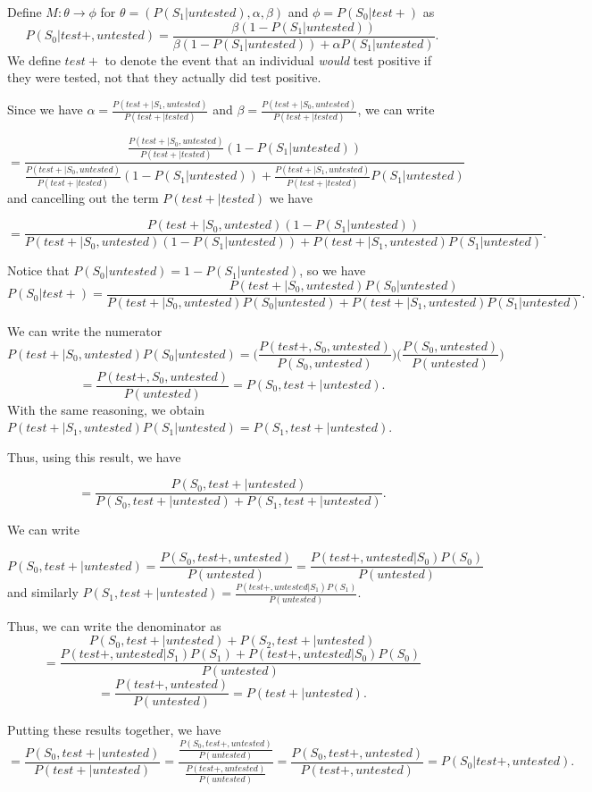 \documentclass[12pt,twoside]{smiththesis}
\begin{document}
Define \(M: \theta \to \phi\) for \(\theta = (P(S_1|untested), \alpha, \beta)\) and \(\phi = P(S_0|test +)\) as
\[P(S_0|test+, untested) = \frac{\beta(1 - P(S_1|untested))}{\beta(1-P(S_1|untested)) + \alpha P(S_1|untested)}.\]
We define \(test +\) to denote the event that an individual \emph{would} test positive if they were tested, not that they actually did test positive.

Since we have \(\alpha = \frac{P(test+|S_1, untested)}{P(test+|tested)}\) and \(\beta = \frac{P(test+|S_0, untested)}{P(test+|tested)}\), we can write

\[ = \frac{\frac{P(test+|S_0, untested)}{P(test+|tested)}(1 - P(S_1|untested))}{\frac{P(test+|S_0, untested)}{P(test+|tested)}(1-P(S_1|untested)) + \frac{P(test+|S_1, untested)}{P(test+|tested)} P(S_1|untested)}\]
and cancelling out the term \(P(test+|tested)\) we have

\[ = \frac{{P(test+|S_0, untested)}(1 - P(S_1|untested))}{P(test+|S_0, untested)(1-P(S_1|untested)) + P(test+|S_1, untested) P(S_1|untested)}.\]

Notice that \(P(S_0|untested) = 1 - P(S_1|untested)\), so we have
\[P(S_0|test+) = \frac{{P(test+|S_0, untested)}P(S_0|untested)}{P(test+|S_0, untested)P(S_0|untested) + P(test+|S_1, untested) P(S_1|untested)}.\]

We can write the numerator \[P(test+|S_0, untested)P(S_0|untested) = \Big( \frac{P(test+,S_0, untested)}{P(S_0, untested)} \Big) \Big(\frac{P(S_0, untested)}{P(untested)}\Big)\]
\[= \frac{P(test+,S_0, untested)}{P(untested)} = P(S_0, test+|untested).\]
With the same reasoning, we obtain \(P(test+|S_1, untested)P(S_1|untested) = P(S_1, test+|untested)\).

Thus, using this result, we have

\[ = \frac{P(S_0, test+|untested)}{P(S_0, test+|untested) + P(S_1, test+|untested)}.\]

We can write

\[P(S_0,test +|untested) = \frac{P(S_0,test +,untested)}{P(untested)} = \frac{P(test + ,untested |S_0) P(S_0)}{P(untested)}\]
and similarly \(P(S_1,test +|untested) = \frac{P(test + ,untested |S_1) P(S_1)}{P(untested)}\).

Thus, we can write the denominator as \[P(S_0,test +|untested) + P(S_2,test +|untested)\]
\[= \frac{P(test + ,untested |S_1) P(S_1) + P(test + ,untested |S_0) P(S_0)}{P(untested)}\]
\[ = \frac{P(test+,untested)}{P(untested)} = P(test + |untested).\]

Putting these results together, we have
\[ = \frac{P(S_0, test+|untested)}{P(test+|untested)} = \frac{\frac{P(S_0, test+, untested)}{P(untested)}}{ \frac{P(test+,untested)}{P(untested)}} = 
\frac{P(S_0, test+, untested)}{P(test+,untested)} =
P(S_0 |test+, untested).\]
\end{document}
